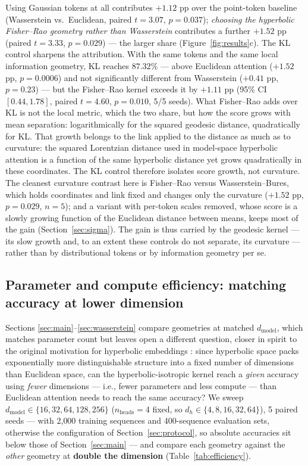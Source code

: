 \documentclass[11pt]{article}
\begin{document}
Using Gaussian tokens at all contributes $+1.12$ pp over the point-token baseline (Wasserstein vs.\ Euclidean, paired $t=3.07$, $p=0.037$); \emph{choosing the hyperbolic Fisher--Rao geometry rather than Wasserstein} contributes a further $+1.52$ pp (paired $t=3.33$, $p=0.029$) --- the larger share (Figure~\ref{fig:results}c). The KL control sharpens the attribution. With the same tokens and the same local information geometry, KL reaches $87.32\%$ --- above Euclidean attention ($+1.52$ pp, $p = 0.0006$) and not significantly different from Wasserstein ($+0.41$ pp, $p = 0.23$) --- but the Fisher--Rao kernel exceeds it by $+1.11$ pp (95\% CI $[0.44, 1.78]$, paired $t = 4.60$, $p = 0.010$, 5/5 seeds). What Fisher--Rao adds over KL is not the local metric, which the two share, but how the score grows with mean separation: logarithmically for the squared geodesic distance, quadratically for KL. That growth belongs to the link applied to the distance as much as to curvature: the squared Lorentzian distance used in model-space hyperbolic attention \cite{chen2022fully} is a function of the same hyperbolic distance yet grows quadratically in these coordinates. The KL control therefore isolates score growth, not curvature. The cleanest curvature contrast here is Fisher--Rao versus Wasserstein--Bures, which holds coordinates and link fixed and changes only the curvature ($+1.52$ pp, $p = 0.029$, $n = 5$); and a variant with per-token scales removed, whose score is a slowly growing function of the Euclidean distance between means, keeps most of the gain (Section~\ref{sec:sigma}). The gain is thus carried by the geodesic kernel --- its slow growth and, to an extent these controls do not separate, its curvature --- rather than by distributional tokens or by information geometry per se.

\subsection{Parameter and compute efficiency: matching accuracy at lower dimension}\label{sec:efficiency}

Sections \ref{sec:main}--\ref{sec:wasserstein} compare geometries at matched $d_{\mathrm{model}}$, which matches parameter count but leaves open a different question, closer in spirit to the original motivation for hyperbolic embeddings \cite{nickel2017}: since hyperbolic space packs exponentially more distinguishable structure into a fixed number of dimensions than Euclidean space, can the hyperbolic-isotropic kernel reach a \emph{given} accuracy using \emph{fewer} dimensions --- i.e., fewer parameters and less compute --- than Euclidean attention needs to reach the same accuracy? We sweep $d_{\mathrm{model}} \in \{16, 32, 64, 128, 256\}$ ($n_{\mathrm{heads}}=4$ fixed, so $d_h \in \{4,8,16,32,64\}$), 5 paired seeds --- with 2{,}000 training sequences and 400-sequence evaluation sets, otherwise the configuration of Section~\ref{sec:protocol}, so absolute accuracies sit below those of Section~\ref{sec:main} --- and compare each geometry against the \emph{other} geometry at \textbf{double the dimension} (Table~\ref{tab:efficiency}).
\end{document}
